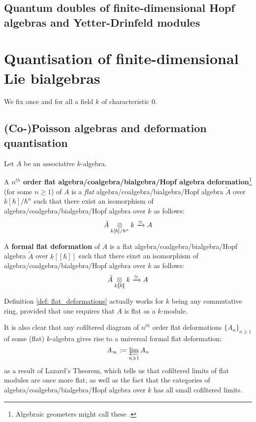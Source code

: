         \subsection{Quantum doubles of finite-dimensional Hopf algebras and Yetter-Drinfeld modules}
        
    \section{Quantisation of finite-dimensional Lie bialgebras}
        \begin{convention}
            We fix once and for all a field $k$ of characteristic $0$. 
        \end{convention}
        
        \subsection{(Co-)Poisson algebras and deformation quantisation}
            \begin{definition} \label{def: flat_deformations}
                Let $A$ be an associative $k$-algebra.
                
                A \textbf{$n^{th}$ order flat algebra/coalgebra/bialgebra/Hopf algebra deformation}\footnote{Algebraic geometers might call these .} (for some $n \geq 1$) of $A$ is a \textit{flat} algebra/coalgebra/bialgebra/Hopf algebra $\tilde{A}$ over $k[\hbar]/\hbar^n$ such that there exist an isomorphism of algebra/coalgebra/bialgebra/Hopf algebra over $k$ as follows:
                    $$\tilde{A} \tensor_{k[\hbar]/\hbar^n} k \xrightarrow[]{\cong} A$$
                    
                A \textbf{formal flat deformation} of $A$ is a flat algebra/coalgebra/bialgebra/Hopf algebra $\tilde{A}$ over $k[\![\hbar]\!]$ such that there eixst an isomorphism of algebra/coalgebra/bialgebra/Hopf algebra over $k$ as follows:
                    $$\tilde{A} \tensor_{k[\![\hbar]\!]} k \xrightarrow[]{\cong} A$$
            \end{definition}
            \begin{remark}
                Definition \ref{def: flat_deformations} actually works for $k$ being any commutative ring, provided that one requires that $A$ is flat as a $k$-module. 
                
                It is also clear that any cofiltered diagram of $n^{th}$ order flat deformations $\{A_n\}_{n \geq 1}$ of some (flat) $k$-algebra gives rise to a universal formal flat deformation:
                    $$A_{\infty} := \projlim_{n \geq 1} A_n$$
                as a result of Lazard's Theorem, which tells us that cofiltered limits of flat modules are once more flat, as well as the fact that the categories of algebra/coalgebra/bialgebra/Hopf algebra over $k$ has all small cofiltered limits. 
            \end{remark}

